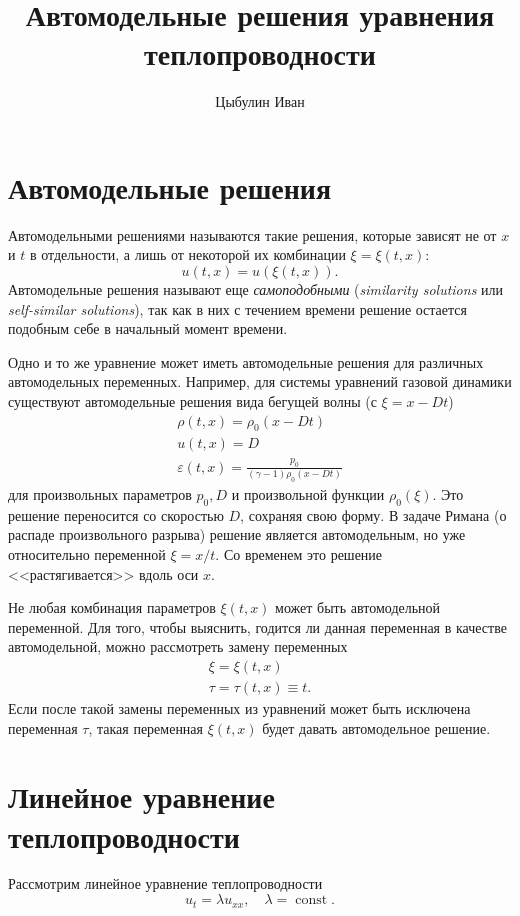 \documentclass[12pt]{article}
\author{Цыбулин Иван}
\title{Автомодельные решения уравнения теплопроводности}
\newcommand{\const}{\operatorname{const}}
\begin{document}
\maketitle

\section{Автомодельные решения}

Автомодельными решениями называются такие решения, которые зависят не от $x$ и $t$ в отдельности, а лишь от некоторой их комбинации $\xi = \xi(t, x)$:
\[
u(t, x) = u(\xi(t, x)).
\]
Автомодельные решения называют еще \emph{самоподобными} (\foreignlanguage{english}{\emph{similarity solutions}} или \foreignlanguage{english}{\emph{self-similar solutions}}), так как в них с течением времени решение остается подобным себе в начальный момент времени.

Одно и то же уравнение может иметь автомодельные решения для различных автомодельных переменных. Например, для системы уравнений газовой динамики существуют автомодельные решения вида бегущей волны (с $\xi = x - Dt$)
\begin{gather*}
\rho(t, x) = \rho_0(x - D t)\\
u(t, x) = D\\
\varepsilon(t, x) = \frac{p_0}{(\gamma - 1) \rho_0(x - D t)}
\end{gather*}
для произвольных параметров $p_0, D$ и произвольной функции $\rho_0(\xi)$. Это решение переносится со скоростью $D$, сохраняя свою форму. В задаче Римана (о распаде произвольного разрыва) решение является автомодельным, но уже относительно переменной $\xi = x/t$. Со временем это решение <<растягивается>> вдоль оси $x$.

Не любая комбинация параметров $\xi(t, x)$ может быть автомодельной переменной. Для того, чтобы выяснить, годится ли данная переменная в качестве автомодельной, можно рассмотреть замену переменных
\begin{gather*}
\xi = \xi(t, x)\\
\tau = \tau(t, x) \equiv t.
\end{gather*}
Если после такой замены переменных из уравнений может быть исключена переменная $\tau$, такая переменная $\xi(t, x)$ будет давать автомодельное решение.

\section{Линейное уравнение теплопроводности}
Рассмотрим линейное уравнение теплопроводности
\[
u_t = \lambda u_{xx}, \quad \lambda = \const.
\]
\end{document}
